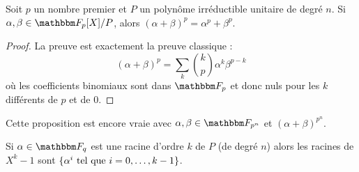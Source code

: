\begin{lemma}       \label{LemZrUUOz}
    Soit \( p\) un nombre premier et \( P\) un polynôme irréductible unitaire de degré \( n\). Si \( \alpha,\beta\in \eF_p[X]/P\), alors \( (\alpha+\beta)^p=\alpha^p+\beta^p\).
\end{lemma}

\begin{proof}
    La preuve est exactement la preuve classique :
    \begin{equation}
        (\alpha+\beta)^p=\sum_k{k\choose p} \alpha^k\beta^{p-k}
    \end{equation}
    où les coefficients binomiaux sont dans \( \eF_p\) et donc nuls pour les \( k\) différents de \( p\) et de \( 0\).
\end{proof}
Cette proposition est encore vraie avec \( \alpha,\beta\in\eF_{p^n}\) et \( (\alpha+\beta)^{p^n}\).

\begin{lemma}
    Si \( \alpha\in \eF_q\) est une racine d'ordre \( k\) de \( P\) (de degré \( n\)) alors les racines de \( X^k-1\) sont \( \{ \alpha^i\text{ tel que } i=0,\ldots, k-1 \}\).
\end{lemma}

